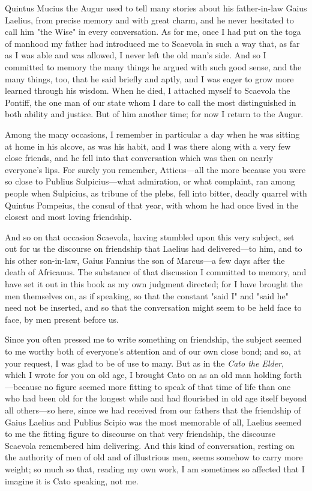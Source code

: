 
 Quintus Mucius the Augur used to tell many stories about his father-in-law Gaius Laelius, from precise memory and with great charm, and he never hesitated to call him "the Wise" in every conversation. As for me, once I had put on the toga of manhood my father had introduced me to Scaevola in such a way that, as far as I was able and was allowed, I never left the old man's side. And so I committed to memory the many things he argued with such good sense, and the many things, too, that he said briefly and aptly, and I was eager to grow more learned through his wisdom. When he died, I attached myself to Scaevola the Pontiff, the one man of our state whom I dare to call the most distinguished in both ability and justice. But of him another time; for now I return to the Augur.

 Among the many occasions, I remember in particular a day when he was sitting at home in his alcove, as was his habit, and I was there along with a very few close friends, and he fell into that conversation which was then on nearly everyone's lips. For surely you remember, Atticus—all the more because you were so close to Publius Sulpicius—what admiration, or what complaint, ran among people when Sulpicius, as tribune of the plebs, fell into bitter, deadly quarrel with Quintus Pompeius, the consul of that year, with whom he had once lived in the closest and most loving friendship.

 And so on that occasion Scaevola, having stumbled upon this very subject, set out for us the discourse on friendship that Laelius had delivered—to him, and to his other son-in-law, Gaius Fannius the son of Marcus—a few days after the death of Africanus. The substance of that discussion I committed to memory, and have set it out in this book as my own judgment directed; for I have brought the men themselves on, as if speaking, so that the constant "said I" and "said he" need not be inserted, and so that the conversation might seem to be held face to face, by men present before us.

 Since you often pressed me to write something on friendship, the subject seemed to me worthy both of everyone's attention and of our own close bond; and so, at your request, I was glad to be of use to many. But as in the \textit{Cato the Elder}, which I wrote for you on old age, I brought Cato on as an old man holding forth—because no figure seemed more fitting to speak of that time of life than one who had been old for the longest while and had flourished in old age itself beyond all others—so here, since we had received from our fathers that the friendship of Gaius Laelius and Publius Scipio was the most memorable of all, Laelius seemed to me the fitting figure to discourse on that very friendship, the discourse Scaevola remembered him delivering. And this kind of conversation, resting on the authority of men of old and of illustrious men, seems somehow to carry more weight; so much so that, reading my own work, I am sometimes so affected that I imagine it is Cato speaking, not me.

